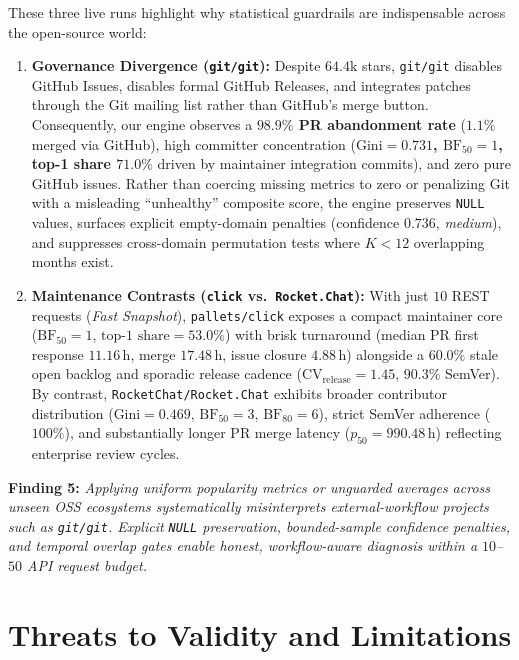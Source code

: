 \documentclass[conference]{IEEEtran}
\begin{document}
These three live runs highlight why statistical guardrails are indispensable across the open-source world:
\begin{enumerate}
    \item \textbf{Governance Divergence (\texttt{git/git}):} Despite $64.4\text{k}$ stars, \texttt{git/git} disables GitHub Issues, disables formal GitHub Releases, and integrates patches through the Git mailing list rather than GitHub's merge button. Consequently, our engine observes a \textbf{$98.9\%$ PR abandonment rate} ($1.1\%$ merged via GitHub), high committer concentration (\textbf{$\text{Gini}=0.731$, $\text{BF}_{50}=1$, top-1 share $71.0\%$} driven by maintainer integration commits), and zero pure GitHub issues. Rather than coercing missing metrics to zero or penalizing Git with a misleading ``unhealthy'' composite score, the engine preserves \texttt{NULL} values, surfaces explicit empty-domain penalties (confidence $0.736$, \emph{medium}), and suppresses cross-domain permutation tests where $K < 12$ overlapping months exist.
    \item \textbf{Maintenance Contrasts (\texttt{click} vs.\ \texttt{Rocket.Chat}):} With just $10$ REST requests (\emph{Fast Snapshot}), \texttt{pallets/click} exposes a compact maintainer core ($\text{BF}_{50}=1$, $\text{top-1 share}=53.0\%$) with brisk turnaround (median PR first response $11.16$\,h, merge $17.48$\,h, issue closure $4.88$\,h) alongside a $60.0\%$ stale open backlog and sporadic release cadence ($\text{CV}_{\text{release}}=1.45$, $90.3\%$ SemVer). By contrast, \texttt{RocketChat/Rocket.Chat} exhibits broader contributor distribution ($\text{Gini}=0.469$, $\text{BF}_{50}=3$, $\text{BF}_{80}=6$), strict SemVer adherence ($100\%$), and substantially longer PR merge latency ($p_{50}=990.48$\,h) reflecting enterprise review cycles.
\end{enumerate}

\textbf{Finding 5:} \emph{Applying uniform popularity metrics or unguarded averages across unseen OSS ecosystems systematically misinterprets external-workflow projects such as \texttt{git/git}. Explicit \texttt{NULL} preservation, bounded-sample confidence penalties, and temporal overlap gates enable honest, workflow-aware diagnosis within a $10$--$50$ API request budget.}

\section{Threats to Validity and Limitations}
\label{sec:threats}
\end{document}
